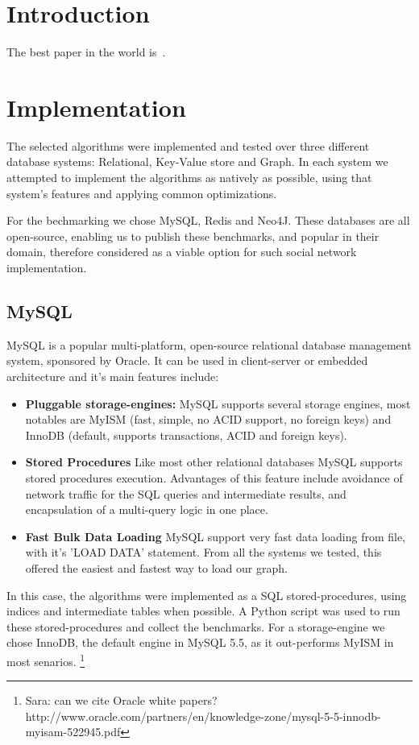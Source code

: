 \section{Introduction}
The best paper in the world is~\cite{Liben-Nowell:2003:LPP:956863.956972}.



\section{Implementation}
The selected algorithms were implemented and tested over three different 
database systems: Relational, Key-Value store and Graph. 
In each system we attempted to implement the algorithms as natively as possible, 
using that system's features and applying common optimizations. 

For the bechmarking we chose MySQL, Redis and Neo4J.
These databases are all open-source, enabling us to publish these benchmarks,
and popular in their domain, therefore considered as a viable option for such social network implementation.

\subsection{MySQL}
MySQL is a popular multi-platform, open-source relational database management
system, sponsored by Oracle. It can be used in client-server or embedded
architecture and it's main features include: 
\begin{itemize}
	\item {\bf Pluggable storage-engines:} MySQL supports several storage engines, 
		most notables are MyISM (fast, simple, no ACID support, no foreign keys) and
		InnoDB (default, supports transactions, ACID and foreign keys).
	\item {\bf Stored Procedures} Like most other relational databases MySQL supports 
		stored procedures execution. Advantages of this feature include 
		avoidance of network traffic for the SQL queries and intermediate results,
		and encapsulation of a multi-query logic in one place.
	\item {\bf Fast Bulk Data Loading} MySQL support very fast data loading from file,
		with it's 'LOAD DATA' statement. From all the systems we tested, this offered 
		the easiest and fastest way to load our graph.
\end{itemize}

In this case, the algorithms were implemented as a SQL stored-procedures,
using indices and intermediate tables when possible. A Python script was used
to run these stored-procedures and collect the benchmarks. For a storage-engine 
we chose InnoDB, the default engine in MySQL 5.5, as it out-performs MyISM in 
most senarios. \footnote{Sara: can we cite Oracle white papers? 
http://www.oracle.com/partners/en/knowledge-zone/mysql-5-5-innodb-myisam-522945.pdf}
\linebreak

